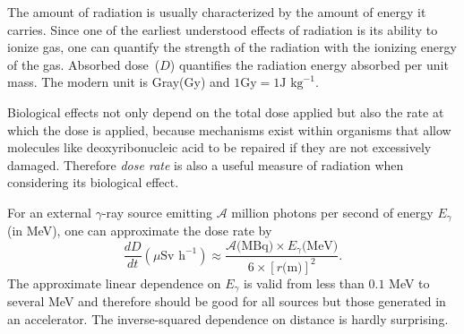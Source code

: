 \documentclass[nofootinbib,preprint,aps]{revtex4-1}
\begin{document}
        The amount of radiation is usually characterized by the amount of energy it carries. Since one of
        the earliest understood effects of radiation is its ability to ionize gas, one can quantify the
        strength of the radiation with the ionizing energy of the gas.
        Absorbed dose~($D$) quantifies the 
        radiation energy absorbed per unit mass. The modern unit is Gray(Gy)
        and $1\text{Gy}=1\text{J kg}^{-1}$.\cite{u16}

        Biological effects not only depend on the total dose applied but also the rate at which the 
        dose is applied, because mechanisms exist within organisms that allow molecules like deoxyribonucleic acid
        to be repaired if they are not excessively damaged. Therefore {\it dose rate} is also a useful
        measure of radiation when considering its biological effect.

        For an external $\gamma$-ray source emitting $\mathcal{A}$ million photons per second 
        of energy $E_{\gamma}$
        (in MeV), one can approximate the dose rate by 
        \begin{equation}
            \frac{dD}{dt}(\mu\text{Sv h}^{-1}) \approx \frac{\mathcal{A}\text{(MBq)}\times E_{\gamma}\text{(MeV)}}
            {6\times [r\text{(m)}]^2}.
        \end{equation}
        The approximate linear dependence on $E_{\gamma}$ is valid from less than $0.1$ MeV to several
        MeV and therefore should be good for all sources but those generated in an accelerator.\cite{my68}
        The inverse-squared dependence on distance is hardly surprising.
\end{document}
